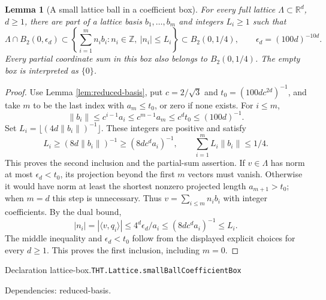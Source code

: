\documentclass[11pt]{article}
\newtheorem{lemma}[theorem]{Lemma}
\theoremstyle{definition}
\newcommand{\R}{\mathbb R}
\newcommand{\Z}{\mathbb Z}
\numberwithin{equation}{section}
\newcommand{\bp}[3]{\par\smallskip\begingroup\footnotesize
\noindent\hypertarget{bp:#1}{\textsf{Declaration #1.}}\quad\nolinkurl{#2}\par
\noindent\textsf{Dependencies:} #3.\par\endgroup\smallskip}
\begin{document}
\begin{lemma}[A small lattice ball in a coefficient box]\label{lem:lattice-box}
For every full lattice $\Lambda\subset\R^d$, $d\ge1$, there are part of a lattice basis $b_1,\ldots,b_m$ and integers $L_i\ge1$ such that
\[
 \Lambda\cap B_2(0,\epsilon_d)\subset
 \left\{\sum_{i=1}^m n_i b_i:n_i\in\Z,\ |n_i|\le L_i\right\}
 \subset B_2(0,1/4),\qquad \epsilon_d=(100d)^{-10d}.
\]
Every partial coordinate sum in this box also belongs to $B_2(0,1/4)$. The empty box is interpreted as $\{0\}$.
\end{lemma}
\begin{proof}
Use Lemma \ref{lem:reduced-basis}, put $c=2/\sqrt3$ and $t_0=(100dc^{2d})^{-1}$, and take $m$ to be the last index with $a_m\le t_0$, or zero if none exists. For $i\le m$,
\[
 \|b_i\|\le c^{i-1}a_i\le c^{m-1}a_m\le c^dt_0\le(100d)^{-1}.
\]
Set $L_i=\lfloor(4d\|b_i\|)^{-1}\rfloor$. These integers are positive and satisfy
\[
 L_i\ge(8d\|b_i\|)^{-1}\ge(8dc^da_i)^{-1},\qquad
 \sum_{i=1}^m L_i\|b_i\|\le1/4.
\]
This proves the second inclusion and the partial-sum assertion. If $v\in\Lambda$ has norm at most $\epsilon_d<t_0$, its projection beyond the first $m$ vectors must vanish. Otherwise it would have norm at least the shortest nonzero projected length $a_{m+1}>t_0$; when $m=d$ this step is unnecessary. Thus $v=\sum_{i\le m}n_ib_i$ with integer coefficients. By the dual bound,
\[
 |n_i|=|\langle v,q_i\rangle|\le4^d\epsilon_d/a_i
 \le(8dc^da_i)^{-1}\le L_i.
\]
The middle inequality and $\epsilon_d<t_0$ follow from the displayed explicit choices for every $d\ge1$. This proves the first inclusion, including $m=0$.
\end{proof}
\bp{lattice-box}{THT.Lattice.smallBallCoefficientBox}{reduced-basis}
\end{document}
